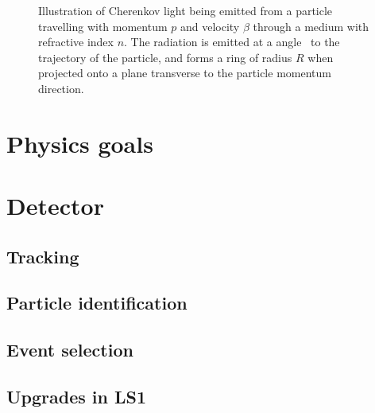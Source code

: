 %   

\begin{figure}
  \centering
  
  \caption{%
    Illustration of Cherenkov light being emitted from a particle travelling 
    with momentum $p$ and velocity $\beta$ through a medium with refractive 
    index $n$.
    The radiation is emitted at a angle \cherenkovangle\ to the trajectory of 
    the particle, and forms a ring of radius $R$ when projected onto a plane 
    transverse to the particle momentum direction.
  }
  \label{fig:intro:lhcb:cherenkov}
\end{figure}

\section{Physics goals}
\label{chap:intro:lhcb:physics}

\section{Detector}
\label{chap:intro:lhcb:detector}

\subsection{Tracking}
\label{chap:intro:lhcb:detector:tracking}

\subsection{Particle identification}
\label{chap:intro:lhcb:detector:pid}

\subsection{Event selection}
\label{chap:intro:lhcb:detector:trigger}

\subsection{Upgrades in \acl{LS1}}
\label{chap:intro:lhcb:detector:upgrades}
